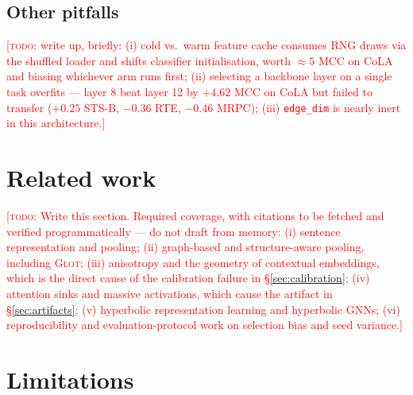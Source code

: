 \documentclass{article} %
\newcommand{\TODO}[1]{\textcolor{red}{[\textsc{todo}: #1]}}
\begin{document}
\subsection{Other pitfalls}
\TODO{write up, briefly: (i) cold vs.\ warm feature cache consumes RNG draws
via the shuffled loader and shifts classifier initialisation, worth
$\approx 5$ MCC on CoLA and biasing whichever arm runs first; (ii) selecting a
backbone layer on a single task overfits --- layer 8 beat layer 12 by
$+4.62$ MCC on CoLA but failed to transfer ($+0.25$ STS-B, $-0.36$ RTE,
$-0.46$ MRPC); (iii) \texttt{edge\_dim} is nearly inert in this architecture.}

\section{Related work}
\label{sec:related}

\TODO{Write this section. Required coverage, with citations to be fetched and
verified programmatically --- do not draft from memory:
(i) sentence representation and pooling;
(ii) graph-based and structure-aware pooling, including \textsc{Glot};
(iii) anisotropy and the geometry of contextual embeddings, which is the
direct cause of the calibration failure in \S\ref{sec:calibration};
(iv) attention sinks and massive activations, which cause the artifact in
\S\ref{sec:artifacts};
(v) hyperbolic representation learning and hyperbolic GNNs;
(vi) reproducibility and evaluation-protocol work on selection bias and seed
variance.}

\section{Limitations}
\label{sec:limitations}
\end{document}
